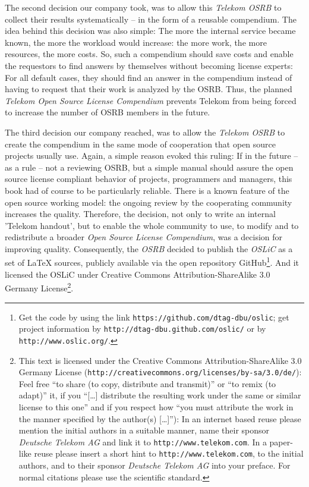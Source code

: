 The second decision our company took, was to allow this \emph{Telekom OSRB} to
collect their results systematically -- in the form of a reusable compendium.
The idea behind this decision was also simple: The more the internal service
became known, the more the workload would increase: the more work, the more
resources, the more costs. So, such a compendium should save costs and enable
the requestors to find answers by themselves without becoming license experts:
For all default cases, they should find an answer in the compendium instead of
having to request that their work is analyzed by the OSRB. Thus, the planned
\emph{Telekom Open Source License Compendium} prevents Telekom from being forced
to increase the number of OSRB members in the future.

The third decision our company reached, was to allow the \emph{Telekom OSRB} to
create the compendium in the same mode of cooperation that open source projects
usually use. Again, a simple reason evoked this ruling: If in the future
-- as a rule -- not a reviewing OSRB, but a simple manual should assure the open
source license compliant behavior of projects, programmers and managers, this
book had of course to be particularly reliable. There is a known feature of the
open source working model: the ongoing review by the cooperating community
increases the quality. Therefore, the decision, not only to write an internal
'Telekom handout', but to enable the whole community to use, to modify and to
redistribute a broader \emph{Open Source License Compendium}, was a decision for
improving quality. Consequently, the \emph{OSRB} decided to publish the
\emph{OSLiC} as a set of LaTeX sources, publicly available via the open
repository GitHub\footnote{Get the code by using the link
\texttt{https://github.com/dtag-dbu/oslic}; get project information by
\texttt{http://dtag-dbu.github.com/oslic/} or by
\texttt{http://www.oslic.org/}.}. And it licensed the OSLiC under Creative
Commons Attribution-ShareAlike 3.0 Germany License\footnote{ This text is
licensed under the Creative Commons Attribution-ShareAlike 3.0 Germany License
(\texttt{http://creativecommons.org/licenses/by-sa/3.0/de/}): Feel free
\enquote{to share (to copy, distribute and transmit)} or \enquote{to remix (to
adapt)} it, if you \enquote{[\ldots] distribute the resulting work under the
same or similar license to this one} and if you respect how \enquote{you must
attribute the work in the manner specified by the author(s) [\ldots]}):
In an internet based reuse please mention the initial authors in a suitable
manner, name their sponsor \textit{Deutsche Telekom AG} and link it to
\texttt{http://www.telekom.com}. In a paper-like reuse please insert a short
hint to \texttt{http://www.telekom.com}, to the initial authors, and to their
sponsor \textit{Deutsche Telekom AG} into your preface. For normal citations
please use the scientific standard.}.

